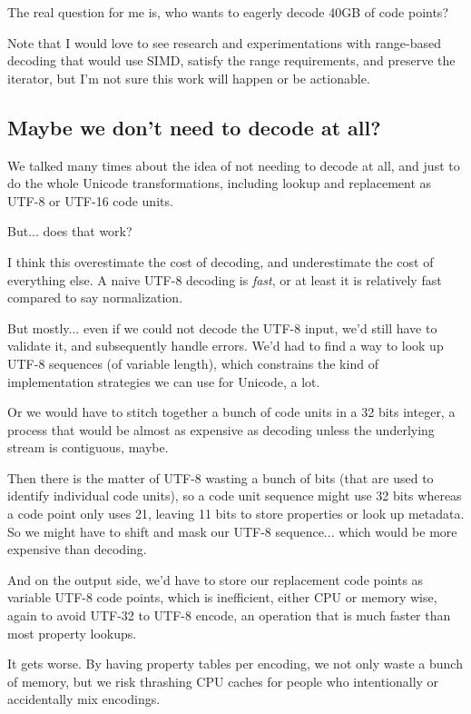 \documentclass{wg21}
\begin{document}
The real question for me is, who wants to eagerly decode 40GB of code points?

Note that I would love to see research and experimentations with range-based decoding that would use SIMD, satisfy the range requirements, and preserve the  iterator, but I'm not sure this work will happen or be actionable.

\subsection{Maybe we don't need to decode at all?}

We talked many times about the idea of not needing to decode at all, and just to do the whole Unicode transformations, including lookup and replacement as UTF-8 or UTF-16 code units.

But... does that work?

I think this overestimate the cost of decoding, and underestimate the cost
of everything else. A naive UTF-8 decoding is \emph{fast}, or at least it is relatively fast compared to say normalization.

But mostly... even if we could not decode the UTF-8 input, we'd still have to validate it, and subsequently handle errors.
We'd had to find a way to look up UTF-8 sequences (of variable length),
which constrains the kind of implementation strategies we can use for Unicode, a lot.

Or we would have to stitch together a bunch of code units in a 32 bits integer, a process that would be almost as expensive as decoding unless the underlying stream is contiguous, maybe.

Then there is the matter of UTF-8 wasting a bunch of bits (that are used to identify individual code units), so a code unit sequence might use 32 bits whereas a code point only uses 21, leaving 11 bits to store properties or look up metadata.
So we might have to shift and mask our UTF-8 sequence... which would be more expensive than decoding.

And on the output side, we'd have to store our replacement code points as
variable UTF-8 code points, which is inefficient, either CPU or memory wise, again to avoid UTF-32 to UTF-8 encode, an operation that is much faster than most property lookups.

It gets worse. By having property tables per encoding, we not only waste a bunch of memory, but we risk thrashing CPU caches for people who intentionally or accidentally mix encodings.
\end{document}
